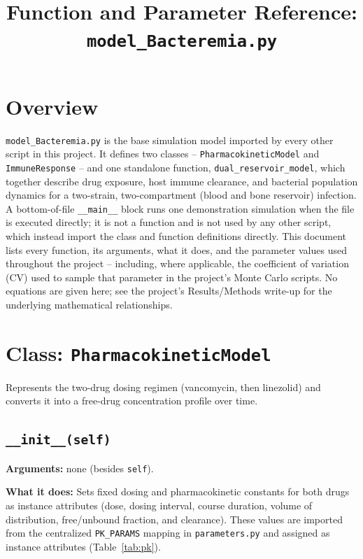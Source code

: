 \documentclass[11pt]{article}
\title{Function and Parameter Reference: \texttt{model\_Bacteremia.py}}
\author{}
\date{}
\begin{document}
\maketitle

\section{Overview}

\texttt{model\_Bacteremia.py} is the base simulation model imported by every
other script in this project. It defines two classes --
\texttt{PharmacokineticModel} and \texttt{ImmuneResponse} -- and one
standalone function, \texttt{dual\_reservoir\_model}, which together
describe drug exposure, host immune clearance, and bacterial population
dynamics for a two-strain, two-compartment (blood and bone reservoir)
infection. A bottom-of-file \texttt{\_\_main\_\_} block runs one
demonstration simulation when the file is executed directly; it is not a
function and is not used by any other script, which instead import the
class and function definitions directly. This document lists every
function, its arguments, what it does, and the parameter values used
throughout the project -- including, where applicable, the coefficient of
variation (CV) used to sample that parameter in the project's Monte Carlo
scripts. No equations are given here; see the project's Results/Methods
write-up for the underlying mathematical relationships.

\section{Class: \texttt{PharmacokineticModel}}

Represents the two-drug dosing regimen (vancomycin, then linezolid) and
converts it into a free-drug concentration profile over time.

\subsection{\texttt{\_\_init\_\_(self)}}

\textbf{Arguments:} none (besides \texttt{self}).

\textbf{What it does:} Sets fixed dosing and pharmacokinetic constants for
both drugs as instance attributes (dose, dosing interval, course duration,
volume of distribution, free/unbound fraction, and clearance). These
values are imported from the centralized \texttt{PK\_PARAMS} mapping in
\texttt{parameters.py} and assigned as instance attributes
(Table~\ref{tab:pk}).
\end{document}
